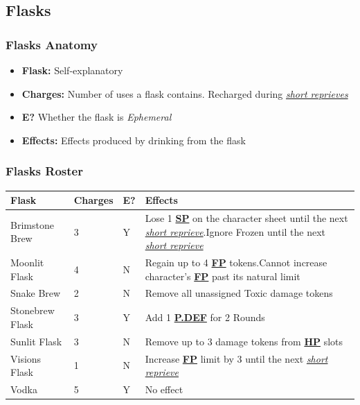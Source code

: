 \documentclass[12pt]{article}
\newcommand{\refto}[1]{\hyperlink{#1}{\textbf{#1}}}
\newcommand{\reftoit}[1]{\hyperlink{#1}{\emph{#1}}}
\begin{document}
\pagebreak

\subsection{Flasks}
\subsubsection*{Flasks Anatomy}
\begin{itemize}
\item \textbf{Flask:} Self-explanatory
\item \textbf{Charges:} Number of uses a flask contains. Recharged during \reftoit{short reprieves}
\item \textbf{E?} Whether the flask is \emph{Ephemeral}
\item \textbf{Effects:} Effects produced by drinking from the flask
\end{itemize}

\subsubsection*{Flasks Roster}
\begin{center}
\begin{tabularx}{\textwidth}{p{}p{}p{}p{}}
\hline
\rowcolor{white} \textbf{Flask} & \textbf{Charges} & \textbf{E?} & \textbf{Effects}\setcounter{rownum}{0}\\
\hline
Brimstone Brew & 3 & Y & Lose 1 \refto{SP} on the character sheet until the next \reftoit{short reprieve}.\newline Ignore Frozen until the next \reftoit{short reprieve}\\
Moonlit Flask & 4 & N & Regain up to 4 \refto{FP} tokens.\newline Cannot increase character’s \refto{FP} past its natural limit \\
Snake Brew & 2 & N & Remove all unassigned Toxic damage tokens \\
Stonebrew Flask & 3 & Y & Add 1 \refto{P.DEF} for 2 Rounds \\
Sunlit Flask & 3 & N & Remove up to 3 damage tokens from \refto{HP} slots \\
Visions Flask & 1 & N & Increase \refto{FP} limit by 3 until the next \reftoit{short reprieve} \\
Vodka & 5 & Y & No effect \\
\hline
\end{tabularx}
\end{center}
\end{document}
